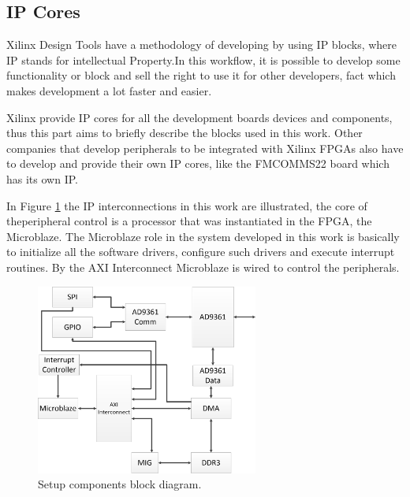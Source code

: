 
\subsection{IP Cores}

Xilinx Design Tools have a methodology of developing by using IP blocks, where IP
stands for intellectual Property.In this workflow, it is possible to develop some
functionality or block and sell the right to use it for other developers, fact
which makes development a lot faster and easier.

Xilinx provide IP cores for all the development boards devices and components,
thus this part aims to briefly describe the blocks used in this work. Other
companies that develop peripherals to be integrated with Xilinx FPGAs also have
to develop and provide their own IP cores, like the FMCOMMS22 board which has its
own IP.

In Figure \ref{fig:setupip} the IP interconnections in this work are
illustrated, the core of theperipheral control is a processor that was
instantiated in the FPGA, the Microblaze. The Microblaze role in the system
developed in this work is basically to initialize all the software drivers,
configure such drivers and execute interrupt routines. By the AXI Interconnect
Microblaze is wired to control the peripherals.

\begin{figure}[htbp]
    \centering
    \includegraphics[width=0.65\textwidth]{./figures/setup_ip}
    \caption{ Setup components block diagram.
    \label{fig:setupip}}
\end{figure}

